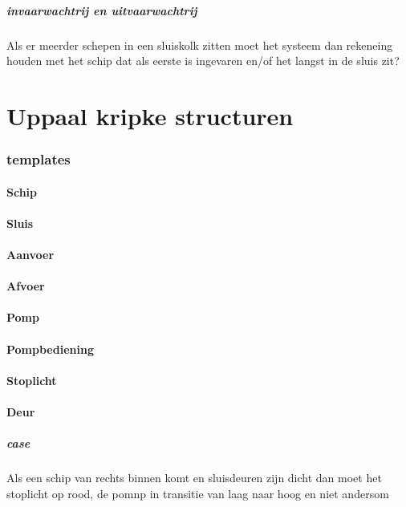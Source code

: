 \documentclass[11pt]{report} %
\begin{document}
\subparagraph{invaarwachtrij en uitvaarwachtrij}
Als er meerder schepen in een sluiskolk zitten moet het systeem dan rekeneing houden met het schip dat als eerste is ingevaren en/of het langst in de sluis zit?



\section{Uppaal kripke structuren}


\subsubsection{templates}

\paragraph{Schip}

\paragraph{Sluis}


\paragraph{Aanvoer}


\paragraph{Afvoer}

\paragraph{Pomp}

\paragraph{Pompbediening}


\paragraph{Stoplicht}

\paragraph{Deur}


 \subparagraph{case}
Als een schip van rechts binnen komt en sluisdeuren zijn dicht dan moet het stoplicht op rood, de pomnp in transitie van laag naar hoog en niet andersom
\end{document}
